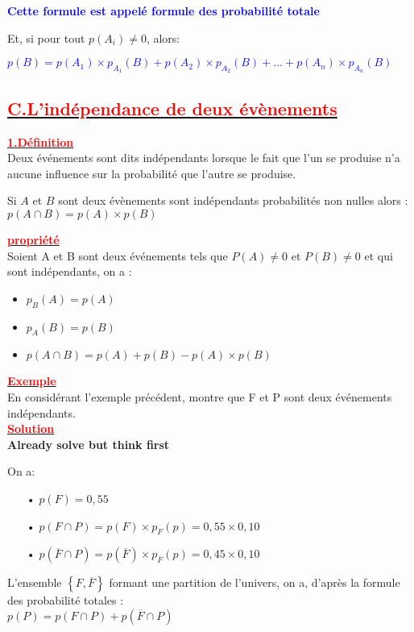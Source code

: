 \documentclass[12pt]{article}
\begin{document}
\textbf{\textcolor{blue}{Cette formule est appelé formule des probabilité totale}}

Et, si pour tout $p(A_{i}) \neq 0$, alors:

\textcolor{blue}{$p(B)=p(A_{1})\times p_{A_{1}}(B)+p(A_{2})\times p_{A_{2}}(B)+...+p(A_{n})\times p_{A_{n}}(B)$}
\subsection*{\underline{\textbf{\textcolor{red}{C.L'indépendance de deux évènements}}}}
\underline{\textbf{\textcolor{red}{1.Définition}}}\\
Deux événements sont dits indépendants lorsque le fait que l’un se produise n’a aucune influence sur la probabilité que l’autre se produise.

Si $A$ et $B$ sont deux évènements sont indépendants probabilités non nulles alors :
$p(A\cap B)=p(A)\times p(B)$

\underline{\textbf{\textcolor{red}{propriété}}}\\

Soient A et B sont deux événements tels que $P(A) \neq 0 $ et $P(B) \neq 0 $ et qui sont indépendants, on a :

\begin{itemize}
\item $p_{B}(A)=p(A)$
\item $p_{A}(B)=p(B)$
\item $p(A\cap B)=p(A) + p(B)-p(A)\times p(B)$
\end{itemize}

\underline{\textbf{\textcolor{red}{Exemple}}}\\
En considérant l'exemple précédent, montre que F et P sont deux événements indépendants.\\
\underline{\textbf{\textcolor{red}{Solution}}}\\
\textbf{Already solve but think first}

On a:
\begin{itemize}
\item[•]$p(F)=0,55$
\item[•] $p(F\cap P)=p(F)\times p_{F}(p)=0,55\times 0,10 $
\item[•] $p(\overline{F}\cap P)=p(\overline{F})\times p_{\overline{F}}(p)=0,45\times 0,10$
\end{itemize}
L'ensemble $\left\lbrace F, \overline{F} \right\rbrace $ formant une partition de l'univers, on a, d'après la formule des probabilité totales :\\
$p(P)=p(F\cap P)+p(\overline{F}\cap P)$
\end{document}
